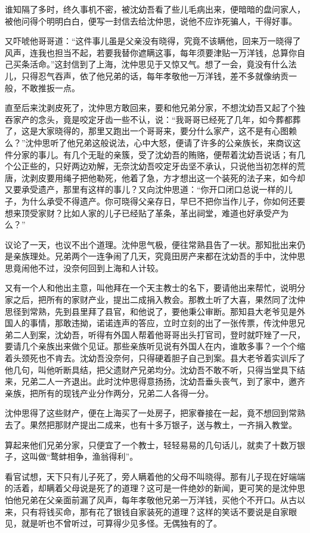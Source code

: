 \documentclass[12pt,UTF8]{ctexbook}
\begin{document}
{{{谁知隔了多时，终久事机不密，被沈幼吾看了些儿毛病出来，便暗暗的盘问家人，被他问得个明明白白，便写一封信去给沈仲思，说他不应诈死骗人，干得好事。

又吓唬他哥哥道：“这件事儿虽是父亲没有晓得，究竟不该瞒他，回来万一晓得了风声，连我也担当不起，若要我替你遮瞒这事，每年须要津贴一万洋钱，总算你自己买条活命。”这封信到了上海，沈仲思见于又惊又气。想了一会，竟没有什么法儿，只得忍气吞声，依了他兄弟的话，每年孝敬他一万洋钱，差不多就像纳贡一般，不敢推扳一点。

直至后来沈剥皮死了，沈仲思方敢回来，要和他兄弟分家，不想沈幼吾又起了个独吞家产的念头，竟是咬定牙齿一些不认，说：“我哥哥已经死了几年，如今葬都葬了，这是大家晓得的，那里又跑出一个哥哥来，要分什么家产，这不是有心图赖么？”沈仲思听了他兄弟这般说法，心中大怒，便请了许多的公亲族长，来商议这件分家的事儿。有几个无耻的亲簇，受了沈幼吾的贿赂，便帮着沈幼吾说话；有几个公正些的，只好两边劝解，无奈沈幼吾咬定牙齿坚不承认，只说他当初怎样的荒唐，沈剥皮要用绳子把他勒死，他着了急，方才想出这一个装死的法子来，如今却又要承受遗产，那里有这样的事儿？又向沈仲思道：“你开口闭口总说一样的儿子，为什么承受不得遗产。你可晓得父亲存日，早巳不把你当作儿子，你如何还要想来顶受家财？比如人家的儿子已经贴了革条，革出祠堂，难道也好承受产为么？”

议论了一天，也议不出个道理。沈仲思气极，便往常熟县告了一状。那知批出来仍是亲族理处。兄弟两个一连争闹了几天，究竟田房产来都在沈幼吾的手中，沈仲思思竟闹他不过，没奈何回到上海和人计较。

又有一个人和他出主意，叫他拜在一个天主教士的名下，要请他出来帮忙，说明分家之后，把所有的家财产业，提出二成捐入教会。那教土听了大喜，果然同了沈仲思径到常熟，先到县里拜了县官，和他说了，要他秉公审断。那知县大老爷见是外国人的事情，那敢违拗，诺诺连声的答应，立时立刻的出了一张传票，传沈仲思兄弟二人到案，沈幼吾，听得有外国人帮着他哥哥出头打官司，登时就吓矬了一尺，要请几个亲族出来做个见证。那些亲族听见说有外国人在内，谁敢多事？一个个缩着头颈死也不肯去。沈幼吾没奈何，只得硬着胆子自己到案。县大老爷着实训斥了他几句，叫他听断具结，把父遗财产兄弟均分。沈幼吾不敢不听，只得当堂具下结来，兄弟二人一齐退出。此时沈仲思得意扬扬，沈幼吾垂头丧气，到了家中，邀齐亲族，把所有的现钱产业分作两分，兄弟二人各得一分。

沈仲思得了这些财产，便在上海买了一处房子，把家眷接在一起，竟不想回到常熟去了。果然把那财产提出二成来，也有十多万银子，送与教土，一齐捐入教堂。

算起来他们兄弟分家，只便宜了一个教士，轻轻易易的几句话儿，就卖了十数万银子，这叫做“鹜蚌相争，渔翁得利”。

看官试想，天下只有儿子死了，旁人瞒着他的父母不叫晓得。那有儿子现在好端端的活着，却瞒着父母说是死了的道理？这可是一件绝妙的新闻，更可笑的是沈仲思怕他兄弟在父亲面前漏了风声，每年孝敬他兄弟一万洋钱，买他个不开口。从古以来，只有将钱买命，那有花了银钱自家装死的道理？这样的笑话不要说是自家眼见，就是听也不曾听过，可算得少见多怪。无偶独有的了。

}}}
\end{document}
